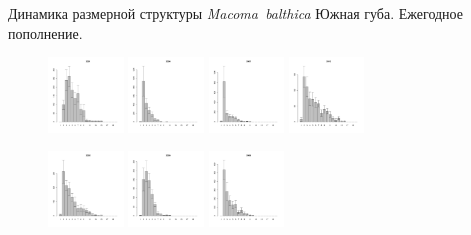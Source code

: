 \documentclass{beamer}
\begin{document}
\begin{frame}{Динамика размерной структуры {\it Macoma~balthica}}
Южная губа. Ежегодное пополнение.
\begin{figure}[h]
\includegraphics[width=20mm]{../White_Sea/Ryashkov_YuG/YuG_2001_.pdf}
\includegraphics[width=20mm]{../White_Sea/Ryashkov_YuG/YuG_2004_.pdf}
\includegraphics[width=20mm]{../White_Sea/Ryashkov_YuG/YuG_2007_.pdf}
\includegraphics[width=20mm]{../White_Sea/Ryashkov_YuG/YuG_2010_.pdf}
\end{figure}
\begin{figure}[h]
\includegraphics[width=20mm]{../White_Sea/Ryashkov_YuG/YuG_2002_.pdf}
\includegraphics[width=20mm]{../White_Sea/Ryashkov_YuG/YuG_2005_.pdf}
\includegraphics[width=20mm]{../White_Sea/Ryashkov_YuG/YuG_2008_.pdf}

\end{figure}
\end{frame}
\end{document}
